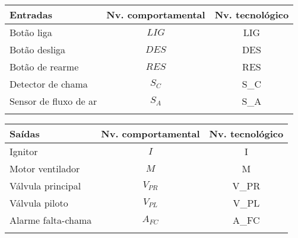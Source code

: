 \begin{longtable}[]{@{}lcc@{}}
\toprule
Entradas & Nv. comportamental & Nv. tecnológico \\
\midrule
\endhead
Botão liga & \(LIG\) & LIG \\
Botão desliga & \(DES\) & DES \\
Botão de rearme & \(RES\) & RES \\
Detector de chama & \(S_C\) & S\_C \\
Sensor de fluxo de ar & \(S_A\) & S\_A \\
\bottomrule
\label{tbl:3}
\end{longtable}

\begin{longtable}[]{@{}lcc@{}}
\toprule
Saídas & Nv. comportamental & Nv. tecnológico \\
\midrule
\endhead
Ignitor & \(I\) & I \\
Motor ventilador & \(M\) & M \\
Válvula principal & \(V_{PR}\) & V\_PR \\
Válvula piloto & \(V_{PL}\) & V\_PL \\
Alarme falta-chama & \(A_{FC}\) & A\_FC \\
\bottomrule
\label{tbl:4}
\end{longtable}